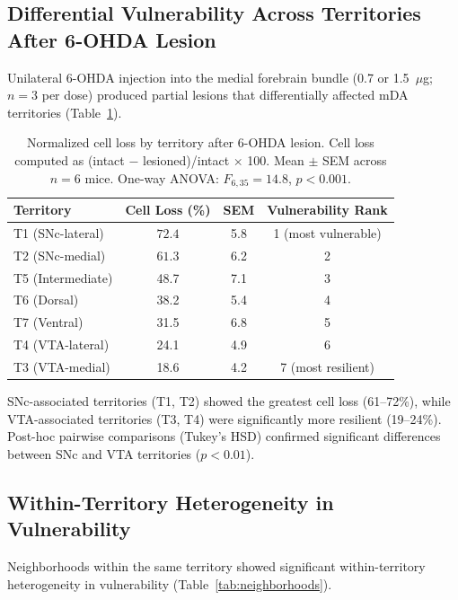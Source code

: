 \documentclass[11pt]{article}
\begin{document}
\subsection{Differential Vulnerability Across Territories After 6-OHDA Lesion}

Unilateral 6-OHDA injection into the medial forebrain bundle (0.7 or 1.5~$\mu$g; $n = 3$ per dose) produced partial lesions that differentially affected mDA territories (Table~\ref{tab:vulnerability}).

\begin{table}[H]
\centering
\caption{Normalized cell loss by territory after 6-OHDA lesion. Cell loss computed as (intact $-$ lesioned)/intact $\times$ 100. Mean $\pm$ SEM across $n = 6$ mice. One-way ANOVA: $F_{6,35} = 14.8$, $p < 0.001$.}
\label{tab:vulnerability}
\begin{tabular}{lccc}
\toprule
Territory & Cell Loss (\%) & SEM & Vulnerability Rank \\
\midrule
T1 (SNc-lateral) & $\mathbf{72.4}$ & 5.8 & 1 (most vulnerable) \\
T2 (SNc-medial) & $\mathbf{61.3}$ & 6.2 & 2 \\
T5 (Intermediate) & 48.7 & 7.1 & 3 \\
T6 (Dorsal) & 38.2 & 5.4 & 4 \\
T7 (Ventral) & 31.5 & 6.8 & 5 \\
T4 (VTA-lateral) & 24.1 & 4.9 & 6 \\
T3 (VTA-medial) & 18.6 & 4.2 & 7 (most resilient) \\
\bottomrule
\end{tabular}
\end{table}

SNc-associated territories (T1, T2) showed the greatest cell loss (61--72\%), while VTA-associated territories (T3, T4) were significantly more resilient (19--24\%). Post-hoc pairwise comparisons (Tukey's HSD) confirmed significant differences between SNc and VTA territories ($p < 0.01$).

\subsection{Within-Territory Heterogeneity in Vulnerability}

Neighborhoods within the same territory showed significant within-territory heterogeneity in vulnerability (Table~\ref{tab:neighborhoods}).
\end{document}
